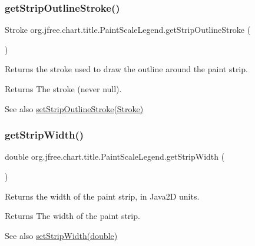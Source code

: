 \subsubsection{\texorpdfstring{get\+Strip\+Outline\+Stroke()}{getStripOutlineStroke()}}
{\footnotesize\ttfamily Stroke org.\+jfree.\+chart.\+title.\+Paint\+Scale\+Legend.\+get\+Strip\+Outline\+Stroke (\begin{DoxyParamCaption}{ }\end{DoxyParamCaption})}

Returns the stroke used to draw the outline around the paint strip.

\begin{DoxyReturn}{Returns}
The stroke (never {\ttfamily null}).
\end{DoxyReturn}
\begin{DoxySeeAlso}{See also}
\mbox{\hyperlink{classorg_1_1jfree_1_1chart_1_1title_1_1_paint_scale_legend_aa72881dc0321ee1d773943e170b60d62}{set\+Strip\+Outline\+Stroke(\+Stroke)}} 
\end{DoxySeeAlso}
\mbox{\label{classorg_1_1jfree_1_1chart_1_1title_1_1_paint_scale_legend_a4fa181b733f23975b9edfc1b50c864a8}} 
\subsubsection{\texorpdfstring{get\+Strip\+Width()}{getStripWidth()}}
{\footnotesize\ttfamily double org.\+jfree.\+chart.\+title.\+Paint\+Scale\+Legend.\+get\+Strip\+Width (\begin{DoxyParamCaption}{ }\end{DoxyParamCaption})}

Returns the width of the paint strip, in Java2D units.

\begin{DoxyReturn}{Returns}
The width of the paint strip.
\end{DoxyReturn}
\begin{DoxySeeAlso}{See also}
\mbox{\hyperlink{classorg_1_1jfree_1_1chart_1_1title_1_1_paint_scale_legend_a0b5b9e831a8f985969497cf9779beea4}{set\+Strip\+Width(double)}} 
\end{DoxySeeAlso}
\mbox{\label{classorg_1_1jfree_1_1chart_1_1title_1_1_paint_scale_legend_a0aa4c63fab33da8ae08e4868e8a4c7a7}} 
